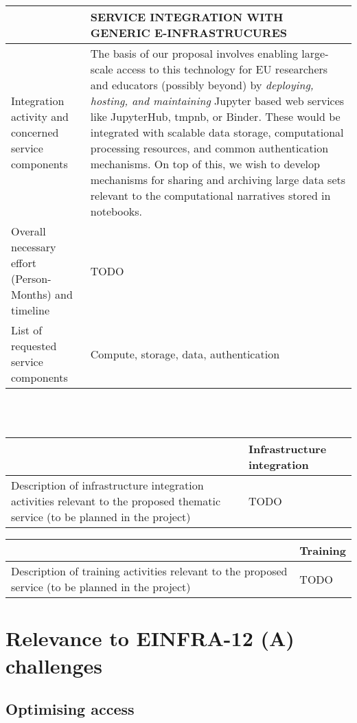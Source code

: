 \begin{tabular}{|p{7cm}|p{7cm}|}
&SERVICE INTEGRATION WITH GENERIC E-INFRASTRUCURES
\\\hline
Integration activity and concerned service components&The basis of our proposal involves
enabling large-scale access to this technology for EU researchers and educators
(possibly beyond) by \emph{deploying, hosting, and maintaining} Jupyter
based web services like JupyterHub, tmpnb, or Binder. These would be integrated
with scalable data storage, computational processing resources, and common
authentication mechanisms. On top of this, we wish to develop mechanisms for sharing
and archiving large data sets relevant to the computational narratives stored in
notebooks.
\\\hline
Overall necessary effort (Person-Months) and timeline&TODO
\\\hline
List of requested service components&Compute, storage, data, authentication
\\\hline
\end{tabular}
\\\\
\begin{tabular}{|p{7cm}|l|}
  &Infrastructure integration
  \\\hline
  Description of infrastructure integration activities relevant to the proposed thematic service (to be planned in the project)&TODO
  \\\hline
\end{tabular}

\begin{tabular}{|p{7cm}|l|}
  &Training
  \\\hline
  Description of training activities relevant to the proposed service (to be planned in the project)&TODO
  \\\hline
\end{tabular}



\section{Relevance to EINFRA-12 (A) challenges}


\subsection{Optimising access}

